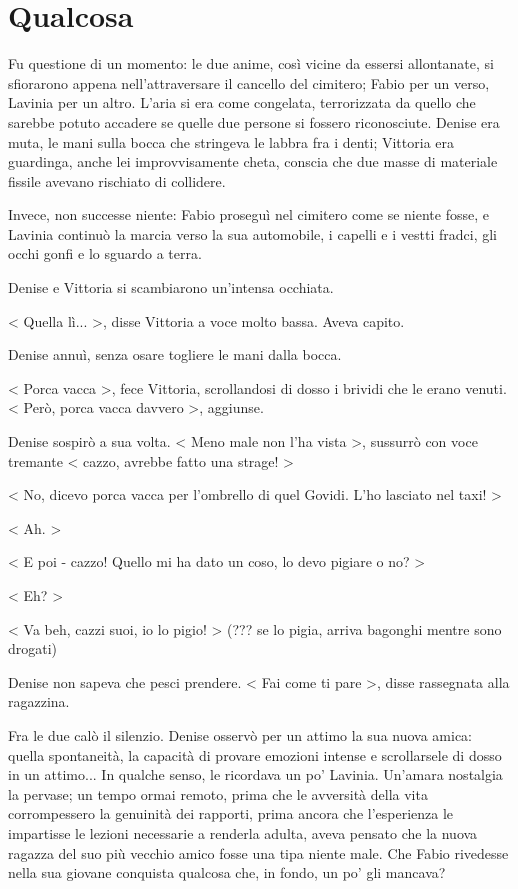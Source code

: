 \chapter{Qualcosa}

Fu questione di un momento: le due anime, così vicine da essersi allontanate, si sfiorarono appena nell'attraversare il cancello del cimitero; Fabio per un verso, Lavinia per un altro. L'aria si era come congelata, terrorizzata da quello che sarebbe potuto accadere se quelle due persone si fossero riconosciute. Denise era muta, le mani sulla bocca che stringeva le labbra fra i denti; Vittoria era guardinga, anche lei improvvisamente cheta, conscia che due masse di materiale fissile avevano rischiato di collidere.

Invece, non successe niente: Fabio proseguì nel cimitero come se niente fosse, e Lavinia continuò la marcia verso la sua automobile, i capelli e i vestti fradci, gli occhi gonfi e lo sguardo a terra.

Denise e Vittoria si scambiarono un'intensa occhiata.

< Quella lì... >, disse Vittoria a voce molto bassa. Aveva capito.

Denise annuì, senza osare togliere le mani dalla bocca.

< Porca vacca >, fece Vittoria, scrollandosi di dosso i brividi che le erano venuti. < Però, porca vacca davvero >, aggiunse.

Denise sospirò a sua volta. < Meno male non l'ha vista >, sussurrò con voce tremante < cazzo, avrebbe fatto una strage! >

< No, dicevo porca vacca per l'ombrello di quel Govidi. L'ho lasciato nel taxi! >

< Ah. >

< E poi - cazzo! Quello mi ha dato un coso, lo devo pigiare o no? > 

< Eh? >

< Va beh, cazzi suoi, io lo pigio! > (??? se lo pigia, arriva bagonghi mentre sono drogati)

Denise non sapeva che pesci prendere. < Fai come ti pare >, disse rassegnata alla ragazzina.

Fra le due calò il silenzio. Denise osservò per un attimo la sua nuova amica: quella spontaneità, la capacità di provare emozioni intense e scrollarsele di dosso in un attimo... In qualche senso, le ricordava un po' Lavinia. Un'amara nostalgia la pervase; un tempo ormai remoto, prima che le avversità della vita corrompessero la genuinità dei rapporti, prima ancora che l'esperienza le impartisse le lezioni necessarie a renderla adulta, aveva pensato che la nuova ragazza del suo più vecchio amico fosse una tipa niente male. Che Fabio rivedesse nella sua giovane conquista qualcosa che, in fondo, un po' gli mancava?

